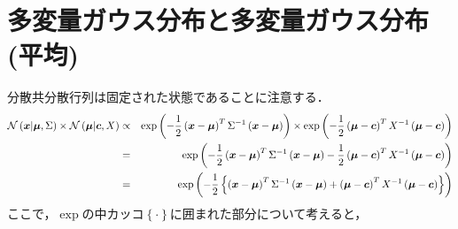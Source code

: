 \documentclass[a4j]{jarticle}
\begin{document}
\section{多変量ガウス分布と多変量ガウス分布(平均)}
分散共分散行列は固定された状態であることに注意する．
\begin{eqnarray}
\operatorname{\mathcal{N}}{(\boldsymbol{x} | \boldsymbol{\mu}, \Sigma)}
\times
\operatorname{\mathcal{N}}{(\boldsymbol{\mu} | \boldsymbol{c}, X)}
&\propto&
\exp{\left( -\frac{1}{2} \left( \boldsymbol{x} - \boldsymbol{\mu}\right)^T \Sigma^{-1} \left( \boldsymbol{x} - \boldsymbol{\mu}\right) \right)}
\times
\exp{\left( -\frac{1}{2} \left( \boldsymbol{\mu} - \boldsymbol{c}\right)^T X^{-1} \left( \boldsymbol{\mu} - \boldsymbol{c}\right) \right)} \nonumber \\
&=&
\exp{\left( -\frac{1}{2} \left( \boldsymbol{x} - \boldsymbol{\mu}\right)^T \Sigma^{-1} \left( \boldsymbol{x} - \boldsymbol{\mu}\right) - \frac{1}{2} \left( \boldsymbol{\mu} - \boldsymbol{c}\right)^T X^{-1} \left( \boldsymbol{\mu} - \boldsymbol{c}\right) \right)}\\
&=&
\exp{\left( -\frac{1}{2}\left\{ \left( \boldsymbol{x} - \boldsymbol{\mu}\right)^T \Sigma^{-1} \left( \boldsymbol{x} - \boldsymbol{\mu}\right) + \left( \boldsymbol{\mu} - \boldsymbol{c}\right)^T X^{-1} \left( \boldsymbol{\mu} - \boldsymbol{c}\right) \right\}  \right)}
\end{eqnarray}
ここで，$\exp$の中カッコ$\left\{\cdot\right\}$に囲まれた部分について考えると，
\end{document}
